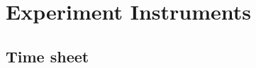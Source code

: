 \chapter{Experiment Instruments}
\label{ap:measurement-instruments}


\def \tick{
$[$\hspace{0.3cm}$]$
}

\def \twooption#1#2{
\tick #1.  \tick #2.
}

\def \threeoption#1#2#3{
\tick #1.\newline
\tick #2.\newline
\tick #3.
}

\def \fouroption#1#2#3#4{
\tick #1.\newline
\tick #2.\newline
\tick #3.\newline
\tick #4.
}

\def \fiveoption#1#2#3#4#5{
\tick #1.\newline
\tick #2.\newline
\tick #3.\newline
\tick #4.\newline
\tick #5.
}
\def \datefield{
    /\hspace{0.4cm}/
}

\def \rcolor{
    \rowcolor[gray]{0.9}
}

\def \hcolor{
    \rowcolor[gray]{0.7}
}

\section{Time sheet}
\label{ap:sec:time-sheet}

